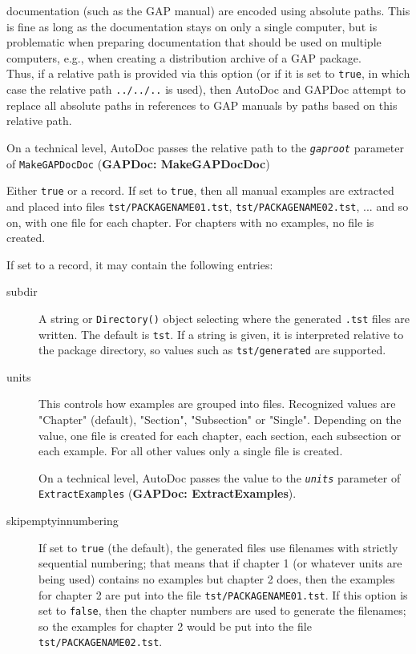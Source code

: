 \documentclass[a4paper,11pt]{report}
\begin{document}
{{{\begin{description}
\begin{description}
\begin{description}
documentation (such as the \textsf{GAP} manual) are encoded using absolute paths. This is fine as long as the
documentation stays on only a single computer, but is problematic when
preparing documentation that should be used on multiple computers, e.g., when
creating a distribution archive of a \textsf{GAP} package.\\
 Thus, if a relative path is provided via this option (or if it is set to \texttt{true}, in which case the relative path \texttt{../../..} is used), then \textsf{AutoDoc} and \textsf{GAPDoc} attempt to replace all absolute paths in references to \textsf{GAP} manuals by paths based on this relative path.

 

 On a technical level, \textsf{AutoDoc} passes the relative path to the \mbox{\texttt{\mdseries\slshape gaproot}} parameter of \texttt{MakeGAPDocDoc} (\textbf{GAPDoc: MakeGAPDocDoc})

 
\end{description}
 
\item[{\mbox{\texttt{\mdseries\slshape extract{\textunderscore}examples}}}]  Either \texttt{true} or a record. If set to \texttt{true}, then all manual examples are extracted and placed into files \texttt{tst/PACKAGENAME01.tst}, \texttt{tst/PACKAGENAME02.tst}, ... and so on, with one file for each chapter. For chapters with no
examples, no file is created.

 If set to a record, it may contain the following entries: 
\begin{description}
\item[{subdir}]  A string or \texttt{Directory()} object selecting where the generated \texttt{.tst} files are written. The default is \texttt{tst}. If a string is given, it is interpreted relative to the package directory,
so values such as \texttt{tst/generated} are supported. 
\item[{units}]  This controls how examples are grouped into files. Recognized values are
"Chapter" (default), "Section", "Subsection" or "Single". Depending on the
value, one file is created for each chapter, each section, each subsection or
each example. For all other values only a single file is created. 

 On a technical level, \textsf{AutoDoc} passes the value to the \mbox{\texttt{\mdseries\slshape units}} parameter of \texttt{ExtractExamples} (\textbf{GAPDoc: ExtractExamples}). 
\item[{skip{\textunderscore}empty{\textunderscore}in{\textunderscore}numbering}]  If set to \texttt{true} (the default), the generated files use filenames with strictly sequential
numbering; that means that if chapter 1 (or whatever units are being used)
contains no examples but chapter 2 does, then the examples for chapter 2 are
put into the file \texttt{tst/PACKAGENAME01.tst}. If this option is set to \texttt{false}, then the chapter numbers are used to generate the filenames; so the examples
for chapter 2 would be put into the file \texttt{tst/PACKAGENAME02.tst}. 
\end{description}
 

\end{description}
\end{description}}}}
\end{document}
